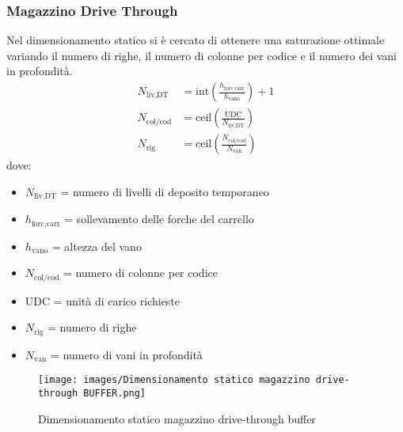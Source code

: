 \documentclass[11pt]{article}
\begin{document}
\subsubsection{Magazzino Drive Through}
Nel dimensionamento statico si è cercato di ottenere una saturazione ottimale variando il numero di righe, il numero di colonne per codice e il numero dei vani in profondità.
\begin{align}
    N_{\text{liv,DT}} &= \text{int}\left(\frac{h_{\text{forc,carr}}}{h_{\text{vano}}}\right) + 1 \\
    N_{\text{col/cod}} &= \text{ceil}\left(\frac{\text{UDC}}{N_{\text{liv,DT}}}\right) \\
    N_{\text{rig}} &= \text{ceil}\left(\frac{N_{\text{col/cod}}}{N_{\text{van}}}\right)
\end{align}
dove:
\begin{itemize}
    \item $N_{\text{liv,DT}}$ = numero di livelli di deposito temporaneo
    \item $h_{\text{forc,carr}}$ = sollevamento delle forche del carrello
    \item $h_{\text{vano}}$ = altezza del vano
    \item $N_{\text{col/cod}}$ = numero di colonne per codice
    \item $\text{UDC}$ = unità di carico richieste
    \item $N_{\text{rig}}$ = numero di righe
    \item $N_{\text{van}}$ = numero di vani in profondità
\end{itemize}

\begin{figure}[H]
    \centering
    \texttt{[image: images/Dimensionamento statico magazzino drive-through BUFFER.png]}
    \caption{Dimensionamento statico magazzino drive-through buffer}
    \label{fig: Dimensionamento statico magazzino drive-through BUFFER}
\end{figure}

\newpage
\end{document}
